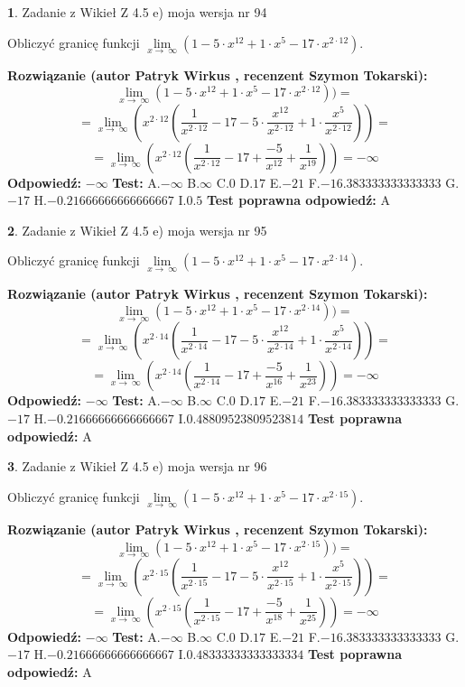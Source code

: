 \documentclass[12pt, a4paper]{article}
\theoremstyle{definition} %
\newtheorem{zad}{}
\newcommand{\zadStart}[1]{\begin{zad}#1\newline}
\newcommand{\zadStop}{\end{zad}}
\newcommand{\rozwStart}[2]{\noindent \textbf{Rozwiązanie (autor #1 , recenzent #2): }\newline}
\newcommand{\rozwStop}{\newline}
\newcommand{\odpStart}{\noindent \textbf{Odpowiedź:}\newline}
\newcommand{\odpStop}{\newline}
\newcommand{\testStart}{\noindent \textbf{Test:}\newline}
\newcommand{\testStop}{\newline}
\newcommand{\kluczStart}{\noindent \textbf{Test poprawna odpowiedź:}\newline}
\newcommand{\kluczStop}{\newline}
\begin{document}
\zadStart{Zadanie z Wikieł Z 4.5 e) moja wersja nr 94}


Obliczyć granicę funkcji  $\lim\limits_{x\to\ \infty}(1 - 5 \cdot x^{12}+1 \cdot x^{5}- 17 \cdot x^{2\cdot12})$.
\zadStop
\rozwStart{Patryk Wirkus}{Szymon Tokarski}
$$\lim\limits_{x\to\ \infty}(1 - 5 \cdot x^{12}+1 \cdot x^{5}- 17 \cdot x^{2\cdot12}))=$$
$$=\lim\limits_{x\to\ \infty}(x^{2\cdot12}(\frac{1}{x^{2\cdot12}}-17 -5 \cdot \frac{x^{12}}{x^{2\cdot12}}+1 \cdot \frac{x^{5}}{x^{2\cdot12}}))=$$
$$=\lim\limits_{x\to\ \infty}(x^{2\cdot12}(\frac{1}{x^{2\cdot12}}-17 + \frac{-5}{x^{12}}+ \frac{1}{x^{19}}))=-\infty$$
\rozwStop
\odpStart
$-\infty$
\odpStop
\testStart
A.$-\infty$ B.$\infty$ C.$0$ D.$17$ E.$-21$
F.$-16.383333333333333$ G.$-17$
H.$-0.21666666666666667$
I.$0.5$
\testStop
\kluczStart
A
\kluczStop



\zadStart{Zadanie z Wikieł Z 4.5 e) moja wersja nr 95}


Obliczyć granicę funkcji  $\lim\limits_{x\to\ \infty}(1 - 5 \cdot x^{12}+1 \cdot x^{5}- 17 \cdot x^{2\cdot14})$.
\zadStop
\rozwStart{Patryk Wirkus}{Szymon Tokarski}
$$\lim\limits_{x\to\ \infty}(1 - 5 \cdot x^{12}+1 \cdot x^{5}- 17 \cdot x^{2\cdot14}))=$$
$$=\lim\limits_{x\to\ \infty}(x^{2\cdot14}(\frac{1}{x^{2\cdot14}}-17 -5 \cdot \frac{x^{12}}{x^{2\cdot14}}+1 \cdot \frac{x^{5}}{x^{2\cdot14}}))=$$
$$=\lim\limits_{x\to\ \infty}(x^{2\cdot14}(\frac{1}{x^{2\cdot14}}-17 + \frac{-5}{x^{16}}+ \frac{1}{x^{23}}))=-\infty$$
\rozwStop
\odpStart
$-\infty$
\odpStop
\testStart
A.$-\infty$ B.$\infty$ C.$0$ D.$17$ E.$-21$
F.$-16.383333333333333$ G.$-17$
H.$-0.21666666666666667$
I.$0.48809523809523814$
\testStop
\kluczStart
A
\kluczStop



\zadStart{Zadanie z Wikieł Z 4.5 e) moja wersja nr 96}


Obliczyć granicę funkcji  $\lim\limits_{x\to\ \infty}(1 - 5 \cdot x^{12}+1 \cdot x^{5}- 17 \cdot x^{2\cdot15})$.
\zadStop
\rozwStart{Patryk Wirkus}{Szymon Tokarski}
$$\lim\limits_{x\to\ \infty}(1 - 5 \cdot x^{12}+1 \cdot x^{5}- 17 \cdot x^{2\cdot15}))=$$
$$=\lim\limits_{x\to\ \infty}(x^{2\cdot15}(\frac{1}{x^{2\cdot15}}-17 -5 \cdot \frac{x^{12}}{x^{2\cdot15}}+1 \cdot \frac{x^{5}}{x^{2\cdot15}}))=$$
$$=\lim\limits_{x\to\ \infty}(x^{2\cdot15}(\frac{1}{x^{2\cdot15}}-17 + \frac{-5}{x^{18}}+ \frac{1}{x^{25}}))=-\infty$$
\rozwStop
\odpStart
$-\infty$
\odpStop
\testStart
A.$-\infty$ B.$\infty$ C.$0$ D.$17$ E.$-21$
F.$-16.383333333333333$ G.$-17$
H.$-0.21666666666666667$
I.$0.48333333333333334$
\testStop
\kluczStart
A
\kluczStop
\end{document}
